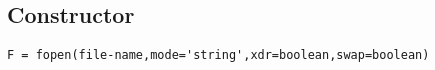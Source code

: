 
\begin{mandesc}
   \\
\end{mandesc}

\subsection*{Constructor}
\begin{verbatim}
F = fopen(file-name,mode='string',xdr=boolean,swap=boolean)
\end{verbatim}
